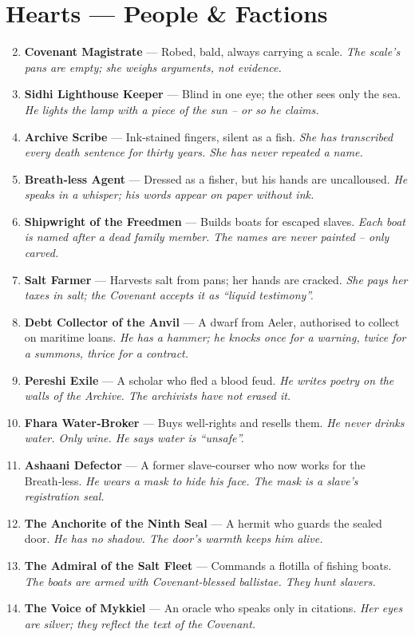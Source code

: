\documentclass[11pt]{book}
\begin{document}
\section*{Hearts — People \& Factions}
\begin{enumerate}
\setcounter{enumi}{1}
\item \textbf{Covenant Magistrate} — Robed, bald, always carrying a scale. \textit{The scale’s pans are empty; she weighs arguments, not evidence.}
\item \textbf{Sidhi Lighthouse Keeper} — Blind in one eye; the other sees only the sea. \textit{He lights the lamp with a piece of the sun – or so he claims.}
\item \textbf{Archive Scribe} — Ink‑stained fingers, silent as a fish. \textit{She has transcribed every death sentence for thirty years. She has never repeated a name.}
\item \textbf{Breath‑less Agent} — Dressed as a fisher, but his hands are uncalloused. \textit{He speaks in a whisper; his words appear on paper without ink.}
\item \textbf{Shipwright of the Freedmen} — Builds boats for escaped slaves. \textit{Each boat is named after a dead family member. The names are never painted – only carved.}
\item \textbf{Salt Farmer} — Harvests salt from pans; her hands are cracked. \textit{She pays her taxes in salt; the Covenant accepts it as “liquid testimony”.}
\item \textbf{Debt Collector of the Anvil} — A dwarf from Aeler, authorised to collect on maritime loans. \textit{He has a hammer; he knocks once for a warning, twice for a summons, thrice for a contract.}
\item \textbf{Pereshi Exile} — A scholar who fled a blood feud. \textit{He writes poetry on the walls of the Archive. The archivists have not erased it.}
\item \textbf{Fhara Water‑Broker} — Buys well‑rights and resells them. \textit{He never drinks water. Only wine. He says water is “unsafe”.}
\item[J] \textbf{Ashaani Defector} — A former slave‑courser who now works for the Breath‑less. \textit{He wears a mask to hide his face. The mask is a slave’s registration seal.}
\item[Q] \textbf{The Anchorite of the Ninth Seal} — A hermit who guards the sealed door. \textit{He has no shadow. The door’s warmth keeps him alive.}
\item[K] \textbf{The Admiral of the Salt Fleet} — Commands a flotilla of fishing boats. \textit{The boats are armed with Covenant‑blessed ballistae. They hunt slavers.}
\item[A] \textbf{The Voice of Mykkiel} — An oracle who speaks only in citations. \textit{Her eyes are silver; they reflect the text of the Covenant.}
\end{enumerate}
\end{document}
